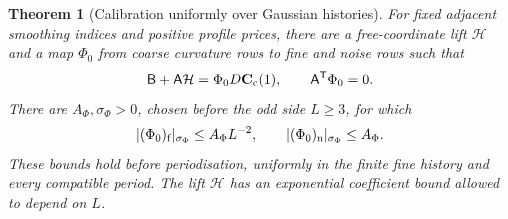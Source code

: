 \documentclass[11pt,reqno]{amsart}
\numberwithin{equation}{section}
\newtheorem{theorem}{Theorem}[section]
\theoremstyle{definition}
\theoremstyle{remark}
\begin{document}
\begin{theorem}[Calibration uniformly over Gaussian histories]
\label{thm:calibrated-row-data}
For fixed adjacent smoothing indices and positive profile prices,
there are a free-coordinate lift \(\mathcal H\) and a map
\(\Phi_0\) from coarse curvature rows to fine and noise rows such that
\begin{equation}
 \mathsf B+\mathsf A\mathcal H
       =\Phi_0D\mathbf C_{\rm c}(1),\qquad
                         \mathsf A^{\mathsf T}\Phi_0=0.
 \label{eq:calibrated-two-identities}
\end{equation}
There are \(A_\Phi,\sigma_\Phi>0\), chosen before the odd side
\(L\ge3\), for which
\begin{equation}
 |(\Phi_0)_{\rm f}|_{\sigma_\Phi}\le A_\Phi L^{-2},
 \qquad |(\Phi_0)_{\rm n}|_{\sigma_\Phi}\le A_\Phi.
 \label{eq:calibrated-preblock-prices}
\end{equation}
These bounds hold before periodisation, uniformly in the finite
fine history and every compatible period. The lift
\(\mathcal H\) has an exponential coefficient bound allowed to
depend on \(L\).
\end{theorem}
\end{document}
